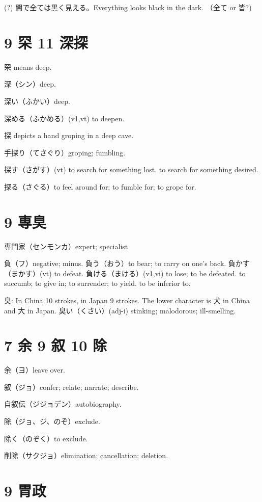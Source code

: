 (?) 闇で全ては黒く見える。Everything looks black in the dark.
（全て or 皆?)

\section{9 罙 11 深探}

罙 means deep.

深（シン）deep.

深い（ふかい）deep.

深める（ふかめる）(v1,vt) to deepen.

探 depicts a hand groping in a deep cave.

手探り（てさぐり）groping; fumbling.

探す（さがす）(vt)
to search for something lost.
to search for something desired.

探る（さぐる）to feel around for; to fumble for; to grope for.

\section{9 専臭}

専門家（センモンカ）expert; specialist

負（フ）negative; minus.
負う（おう）to bear; to carry on one's back.
負かす（まかす）(vt) to defeat.
負ける（まける）(v1,vi)
to lose; to be defeated.
to succumb; to give in; to surrender; to yield.
to be inferior to.

臭: In China 10 strokes, in Japan 9 strokes.
The lower character is 犬 in China and 大 in Japan.
臭い（くさい）(adj-i) stinking; malodorous; ill-smelling.

\section{7 余 9 叙 10 除}

余（ヨ）leave over.

叙（ジョ）confer; relate; narrate; describe.

自叙伝（ジジョデン）autobiography.

除（ジョ、ジ、のぞ）exclude.

除く（のぞく）to exclude.

削除（サクジョ）elimination; cancellation; deletion.

\section{9 胃政}

